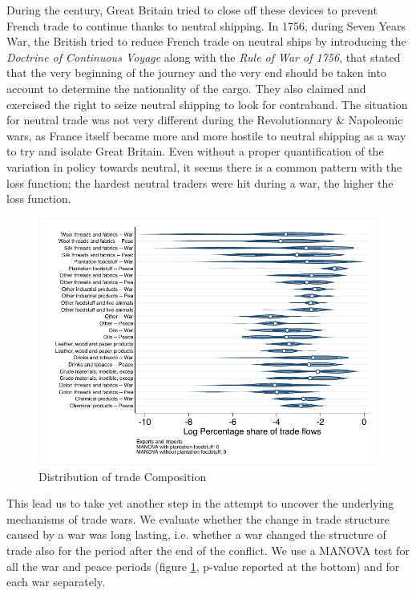 \documentclass[12pt,a4paper,notitlepage]{article}
\begin{document}
During the century, Great Britain tried to close off these devices to prevent French trade to continue thanks to neutral shipping.
In 1756, during Seven Years War, the British tried to reduce French trade on neutral ships by introducing the \textit{Doctrine of Continuous Voyage} along with the \textit{Rule of War of 1756}, that stated that the very beginning of the journey and the very end should be taken into account to determine the nationality of the cargo.
They also claimed and exercised the right to seize neutral shipping to look for contraband.
The situation for neutral trade was not very different during the Revolutionnary \& Napoleonic wars, as France itself became more and more hostile to neutral shipping as a way to try and isolate Great Britain. Even without a proper quantification of the variation in policy towards neutral, it seems there is a common pattern with the loss function; the hardest neutral traders were hit during a war, the higher the loss function. 
\begin{figure}
\includegraphics[scale=.7]{peace_war_national_distribution_XI.pdf}
\caption{Distribution of trade Composition}
\label{peace_war_national_distribution_XI}
\end{figure}
This lead us to take yet another step in the attempt to uncover the underlying mechanisms of trade wars.
We evaluate whether the change in trade structure caused by a war was long lasting, i.e. whether a war changed the structure of trade also for the period after the end of the conflict.
We use a MANOVA test for all the war and peace periods (figure \ref{peace_war_national_distribution_XI}, p-value reported at the bottom) and for each war separately.
\end{document}
